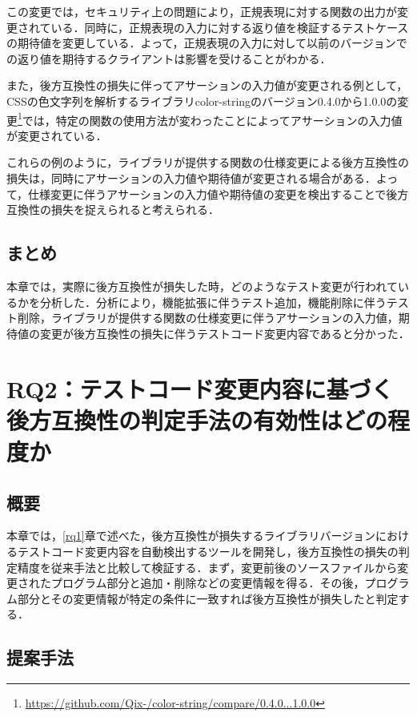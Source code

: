 \documentclass[11pt,dvipdfmx]{jreport}
\begin{document}
この変更では，セキュリティ上の問題により，正規表現に対する関数の出力が変更されている．同時に，正規表現の入力に対する返り値を検証するテストケースの期待値を変更している．よって，正規表現の入力に対して以前のバージョンでの返り値を期待するクライアントは影響を受けることがわかる．

また，後方互換性の損失に伴ってアサーションの入力値が変更される例として，CSSの色文字列を解析するライブラリcolor-stringのバージョン0.4.0から1.0.0の変更\footnote{\url{https://github.com/Qix-/color-string/compare/0.4.0...1.0.0}}では，特定の関数の使用方法が変わったことによってアサーションの入力値が変更されている．

これらの例のように，ライブラリが提供する関数の仕様変更による後方互換性の損失は，同時にアサーションの入力値や期待値が変更される場合がある．よって，仕様変更に伴うアサーションの入力値や期待値の変更を検出することで後方互換性の損失を捉えられると考えられる．

\section{まとめ}
本章では，実際に後方互換性が損失した時，どのようなテスト変更が行われているかを分析した．分析により，機能拡張に伴うテスト追加，機能削除に伴うテスト削除，ライブラリが提供する関数の仕様変更に伴うアサーションの入力値，期待値の変更が後方互換性の損失に伴うテストコード変更内容であると分かった．

\chapter{RQ2：テストコード変更内容に基づく後方互換性の判定手法の有効性はどの程度か}

\section{概要}
本章では，\ref{rq1}章で述べた，後方互換性が損失するライブラリバージョンにおけるテストコード変更内容を自動検出するツールを開発し，後方互換性の損失の判定精度を従来手法と比較して検証する．まず，変更前後のソースファイルから変更されたプログラム部分と追加・削除などの変更情報を得る．その後，プログラム部分とその変更情報が特定の条件に一致すれば後方互換性が損失したと判定する．

\section{提案手法}\label{rq2:teian}
\end{document}

